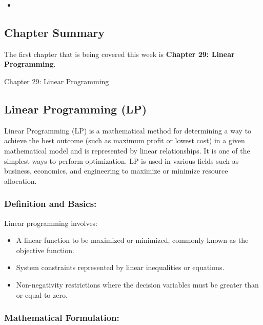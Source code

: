 \begin{itemize}
    \item {} \textbullet {} 
\end{itemize}

\subsection{Chapter Summary}

The first chapter that is being covered this week is \textbf{Chapter 29: Linear Programming}.

\begin{notes}{Chapter 29: Linear Programming}
    \subsection*{Linear Programming (LP)}

    Linear Programming (LP) is a mathematical method for determining a way to achieve the best outcome (such as maximum profit or lowest cost) in a given mathematical model and is represented by 
    linear relationships. It is one of the simplest ways to perform optimization. LP is used in various fields such as business, economics, and engineering to maximize or minimize resource allocation. \vspace*{1em}
    
    \subsubsection*{Definition and Basics:}
    
    Linear programming involves:
    \begin{itemize}
        \item A linear function to be maximized or minimized, commonly known as the objective function.
        \item System constraints represented by linear inequalities or equations.
        \item Non-negativity restrictions where the decision variables must be greater than or equal to zero.
    \end{itemize}
    
    \subsubsection*{Mathematical Formulation:}
    

\end{notes}
